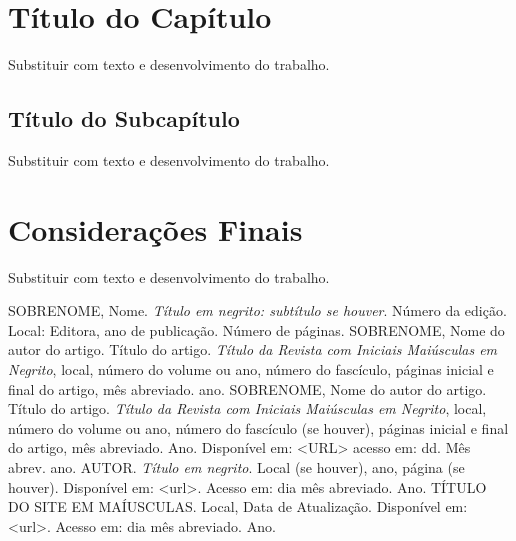 \documentclass[a4paper,12pt]{article}
\begin{document}
\section{Título do Capítulo}
Substituir com texto e desenvolvimento do trabalho.

\subsection{Título do Subcapítulo}
Substituir com texto e desenvolvimento do trabalho.

\section{Considerações Finais}
Substituir com texto e desenvolvimento do trabalho.
\newpage

\begin{thebibliography}{99}
     SOBRENOME, Nome. \textit{Título em negrito: subtítulo se houver}. Número da edição. Local: Editora, ano de publicação. Número de páginas.
     SOBRENOME, Nome do autor do artigo. Título do artigo. \textit{Título da Revista com Iniciais Maiúsculas em Negrito}, local, número do volume ou ano, número do fascículo, páginas inicial e final do artigo, mês abreviado. ano.
     SOBRENOME, Nome do autor do artigo. Título do artigo. \textit{Título da Revista com Iniciais Maiúsculas em Negrito}, local, número do volume ou ano, número do fascículo (se houver), páginas inicial e final do artigo, mês abreviado. Ano. Disponível em: <URL> acesso em: dd. Mês abrev. ano.
     AUTOR. \textit{Título em negrito}. Local (se houver), ano, página (se houver). Disponível em: <url>. Acesso em: dia mês abreviado. Ano.
     TÍTULO DO SITE EM MAÍUSCULAS. Local, Data de Atualização. Disponível em: <url>. Acesso em: dia mês abreviado. Ano.
\end{thebibliography}
\end{document}
